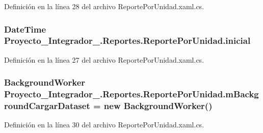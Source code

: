 Definición en la línea 28 del archivo Reporte\-Por\-Unidad.\-xaml.\-cs.

\hypertarget{class_proyecto___integrador__3_1_1_reportes_1_1_reporte_por_unidad_a580b30fc38c300431b3827dd370c794b}{
\subsubsection[{inicial}]{\setlength{\rightskip}{0pt plus 5cm}Date\-Time Proyecto\-\_\-\-Integrador\-\_.\-Reportes.\-Reporte\-Por\-Unidad.\-inicial}}\label{class_proyecto___integrador__3_1_1_reportes_1_1_reporte_por_unidad_a580b30fc38c300431b3827dd370c794b}


Definición en la línea 27 del archivo Reporte\-Por\-Unidad.\-xaml.\-cs.

\hypertarget{class_proyecto___integrador__3_1_1_reportes_1_1_reporte_por_unidad_af7637868838da0f9e0f02b266fde6c59}{
\subsubsection[{m\-Background\-Cargar\-Dataset}]{\setlength{\rightskip}{0pt plus 5cm}Background\-Worker Proyecto\-\_\-\-Integrador\-\_.\-Reportes.\-Reporte\-Por\-Unidad.\-m\-Background\-Cargar\-Dataset = new Background\-Worker()\hspace{0.3cm}{\ttfamily [private]}}}\label{class_proyecto___integrador__3_1_1_reportes_1_1_reporte_por_unidad_af7637868838da0f9e0f02b266fde6c59}


Definición en la línea 30 del archivo Reporte\-Por\-Unidad.\-xaml.\-cs.


